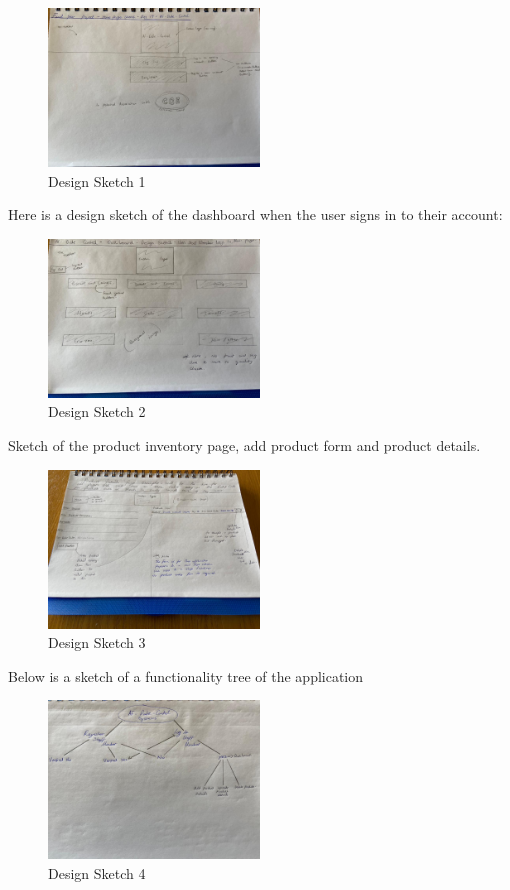 \begin{figure}[h!]
	\caption{Design Sketch 1}
	\label{image:sketch1}
	\centering
	\includegraphics[width=0.5\textwidth]{images/sketch1.jpg}
\end{figure}

Here is a design sketch of the dashboard when the user signs in to their account:

\begin{figure}[h!]
	\caption{Design Sketch 2}
	\label{image:sketch2}
	\centering
	\includegraphics[width=0.5\textwidth]{images/sketch2.jpg}
\end{figure}

Sketch of the product inventory page, add product form and product details.
\begin{figure}[h!]
	\caption{Design Sketch 3}
	\label{image:sketch3}
	\centering
	\includegraphics[width=0.5\textwidth]{images/sketch3.jpg}
\end{figure}

Below is a sketch of a functionality tree of the application
\begin{figure}[h!]
	\caption{Design Sketch 4}
	\label{image:sketch4}
	\centering
	\includegraphics[width=0.5\textwidth]{images/sketch4.jpg}
\end{figure}

